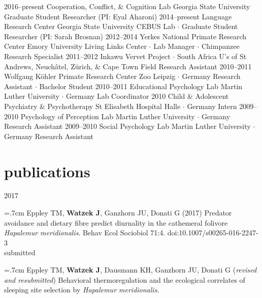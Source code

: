 \documentclass[]{friggeri-cv}
\begin{document}
\begin{entrylist}
  \entry
    {2016--present}
    {Cooperation, Conflict, \& Cognition Lab}
    {Georgia State University}
    {Graduate Student Researcher (PI: Eyal Aharoni)}
  \entry
    {2014--present}
    {Language Research Center}
    {Georgia State University}
    {CEBUS Lab $\cdot$ Graduate Student Researcher (PI: Sarah Brosnan)}
  \entry
    {2012--2014}
    {Yerkes National Primate Research Center}
    {Emory University}
    {Living Links Center $\cdot$ Lab Manager $\cdot$ Chimpanzee Research Specialist}
  \entry
    {2011--2012}
    {Inkawu Vervet Project $\cdot$ South Africa}
    {U's of St Andrews, Neuch\^{a}tel, Z\"urich, \& Cape Town}
    {Field Research Assistant}
  \entry
    {2010--2011}
    {Wolfgang K\"{o}hler Primate Research Center}
    {Zoo Leipzig $\cdot$ Germany}
    {Research Assistant $\cdot$ Bachelor Student}
  \entry
    {2010--2011}
    {Educational Psychology Lab}
    {Martin Luther University $\cdot$ Germany}
    {Lab Coordinator}
  \entry
    {2010}
    {Child \& Adolescent Psychiatry \& Psychotherapy}
    {St Elisabeth Hospital Halle $\cdot$ Germany}
    {Intern}
  \entry
    {2009--2010}
    {Psychology of Perception Lab}
    {Martin Luther University $\cdot$ Germany}
    {Research Assistant}
  \entry
    {2009--2010}
    {Social Psychology Lab}
    {Martin Luther University $\cdot$ Germany}
    {Research Assistant}
\end{entrylist}


\newpage
\thispagestyle{fancy}

\section{publications}

{\large{} 2017}

\hangindent=.7cm Eppley TM, \textbf{Watzek J}, Ganzhorn JU, Donati G (2017) Predator avoidance and dietary fibre predict diurnality in the cathemeral folivore \emph{Hapalemur meridionalis}. Behav Ecol Sociobiol 71:4. doi:10.1007/s00265-016-2247-3 \\[-.1cm]

{\large{} submitted}

\hangindent=.7cm Eppley TM, \textbf{Watzek J}, Dausmann KH, Ganzhorn JU, Donati G (\emph{revised and resubmitted}) Behavioral thermoregulation and the ecological correlates of sleeping site selection by \emph{Hapalemur meridionalis}.
\end{document}
